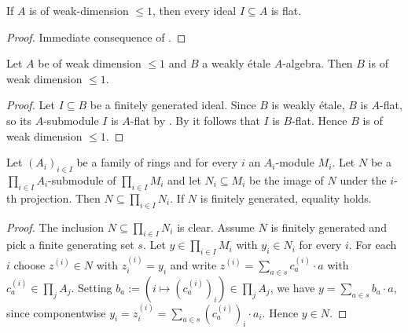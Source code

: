 \begin{corollary}[\stacksproject{092S}, (1) => (2)]
    If $A$ is of weak-dimension $\le 1$, then every ideal $I \subseteq A$ is flat.
    \label{lemma:weak-dim-ideal-flat}
    \leanok
\end{corollary}

\begin{proof}
    \leanok
    Immediate consequence of .
\end{proof}

\begin{lemma}[\stacksproject{092E}]
    Let $A$ be of weak dimension $\le 1$ and $B$ a weakly étale $A$-algebra. Then
    $B$ is of weak dimension $\le 1$.
    \label{lemma:weakly-etale-preserve-weak-dim}
    \leanok
\end{lemma}

\begin{proof}
    \leanok
    Let $I \subseteq B$ be a finitely generated ideal. Since $B$ is weakly étale, $B$ is
    $A$-flat, so its $A$-submodule $I$ is $A$-flat by .
    By  it follows that $I$ is $B$-flat. Hence $B$ is of weak
    dimension $\le 1$.
\end{proof}

\begin{lemma}
    Let $(A_i)_{i \in I}$ be a family of rings and for every $i$ an $A_i$-module $M_i$.
    Let $N$ be a $\prod_{i \in I} A_i$-submodule of $\prod_{i \in I} M_i$ and let
    $N_i \subseteq M_i$ be the image of $N$ under the $i$-th projection.
    Then $N \subseteq \prod_{i \in I} N_i$.
    If $N$ is finitely generated, equality holds.
    \label{lemma:prod-submodule-fg}
    \leanok
\end{lemma}

\begin{proof}
    \leanok
    The inclusion $N \subseteq \prod_{i \in I} N_i$ is clear. Assume $N$ is finitely generated
    and pick a finite generating set $s$. Let $y \in \prod_{i \in I} M_i$ with $y_i \in N_i$ for
    every $i$. For each $i$ choose $z^{(i)} \in N$ with $z^{(i)}_i = y_i$ and write
    $z^{(i)} = \sum_{a \in s} c^{(i)}_a \cdot a$ with $c^{(i)}_a \in \prod_{j} A_j$. Setting
    $b_a := (i \mapsto (c^{(i)}_a)_i) \in \prod_j A_j$, we have $y = \sum_{a \in s} b_a \cdot a$,
    since componentwise $y_i = z^{(i)}_i = \sum_{a \in s} (c^{(i)}_a)_i \cdot a_i$. Hence $y \in N$.
\end{proof}

